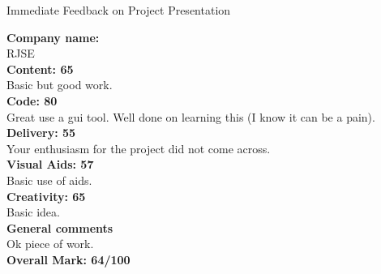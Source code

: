 \documentclass{article}
\begin{document}
\begin{center}
\Huge{Immediate Feedback on Project Presentation}\\
\end{center}


\normalsize
\textbf{Company name:}\\

RJSE \\

\textbf{Content: 65}\\

Basic but good work.\\

\textbf{Code: 80}\\

Great use a gui tool.
Well done on learning this (I know it can be a pain).\\

\textbf{Delivery: 55}\\

Your enthusiasm for the project did not come across.\\

\textbf{Visual Aids: 57}\\

Basic use of aids.\\

\textbf{Creativity: 65}\\

Basic idea.\\

\textbf{General comments}\\

Ok piece of work.\\

\textbf{Overall Mark: 64/100}
\end{document}
